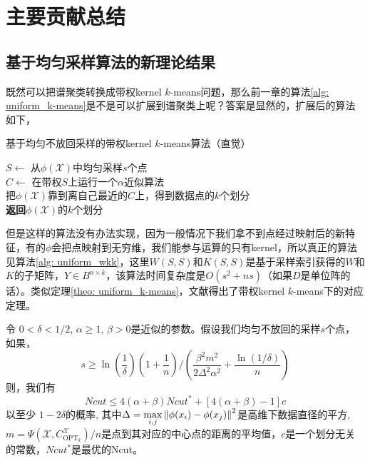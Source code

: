 \section{主要贡献总结}

\subsection{基于均匀采样算法的新理论结果}
既然可以把谱聚类转换成带权kernel $k$-means问题，那么前一章的算法\ref{alg: uniform_k-means}是不是可以扩展到谱聚类上呢？答案是显然的，扩展后的算法如下，
\begin{algorithm}
    \caption{基于均匀不放回采样的带权kernel $k$-means算法（直觉）}
    $S \gets$ 从$\phi(\mathcal{X})$中均匀采样$s$个点\\
    $C \gets$ 在带权$S$上运行一个$\alpha$近似算法\\
    把$\phi(\mathcal{X})$靠到离自己最近的$C$上，得到数据点的$k$个划分\\
    \textbf{返回}$\phi(\mathcal{X})$的$k$个划分
\end{algorithm}
但是这样的算法没有办法实现，因为一般情况下我们拿不到点经过映射后的新特征，有的$\phi$会把点映射到无穷维，我们能参与运算的只有kernel，所以真正的算法见算法\ref{alg: uniform_wkk}，这里$W(S,S)$和$K(S,S)$是基于采样索引获得的$W$和$K$的子矩阵，$Y\in B^{n\times k}$，该算法时间复杂度是$O(s^2+ns)$（如果$D$是单位阵的话）。类似定理\ref{theo: uniform_k-means}，文献\cite{Mohan:2017:BNA:3172077.3172235}得出了带权kernel $k$-means下的对应定理。
\begin{theorem}[均匀不放回采样的谱聚类解的质量]
    \label{theo: uniform_wkk}
    令 $0 < \delta <1/2$, $\alpha \geq 1$, $\beta >0$是近似的参数。假设我们均匀不放回的采样$s$个点，如果，
    \begin{equation}
    s \geq \ln(\frac{1}{\delta})(1+\frac{1}{n})/(\frac{\beta^2 m^2}{2\Delta^2 \alpha^2}+\frac{\ln(1/\delta)}{n})
    \end{equation}
    则，我们有
    \begin{equation}
    Ncut \leq 4(\alpha + \beta) Ncut^* + [4(\alpha + \beta)-1]c
    \end{equation}
    以至少 $1-2\delta$的概率, 其中$\Delta = \max\limits_{i,j}\left\lVert\phi(x_i) - \phi(x_j)\right\rVert^2$是高维下数据直径的平方, $m = \Psi(\mathcal{X},C_{\text{OPT}_k}^{\mathcal{X}})/n$是点到其对应的中心点的距离的平均值，$c$是一个划分无关的常数，$Ncut^*$是最优的Ncut。
\end{theorem}
